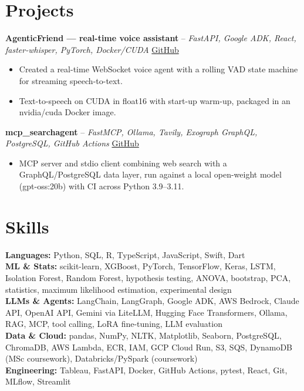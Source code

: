 \documentclass[a4paper,10pt]{article}
\begin{document}
\section{Projects}
\noindent\textbf{AgenticFriend — real-time voice assistant} -- \textit{FastAPI, Google ADK, React, faster-whisper, PyTorch, Docker/CUDA} \hfill \href{https://github.com/Thiruvel-AP/adk_multi-agent}{GitHub}
\begin{itemize}
  \item Created a real-time WebSocket voice agent with a rolling VAD state machine for streaming speech-to-text.
  \item Text-to-speech on CUDA in float16 with start-up warm-up, packaged in an nvidia/cuda Docker image.
\end{itemize}
\noindent\textbf{mcp\_searchagent} -- \textit{FastMCP, Ollama, Tavily, Exograph GraphQL, PostgreSQL, GitHub Actions} \hfill \href{https://github.com/Thiruvel-AP/mcp_searchagent}{GitHub}
\begin{itemize}
  \item MCP server and stdio client combining web search with a GraphQL/PostgreSQL data layer, run against a local open-weight model (gpt-oss:20b) with CI across Python 3.9–3.11.
\end{itemize}

\section{Skills}
\textbf{Languages:} Python, SQL, R, TypeScript, JavaScript, Swift, Dart\\
\textbf{ML \& Stats:} scikit-learn, XGBoost, PyTorch, TensorFlow, Keras, LSTM, Isolation Forest, Random Forest, hypothesis testing, ANOVA, bootstrap, PCA, statistics, maximum likelihood estimation, experimental design\\
\textbf{LLMs \& Agents:} LangChain, LangGraph, Google ADK, AWS Bedrock, Claude API, OpenAI API, Gemini via LiteLLM, Hugging Face Transformers, Ollama, RAG, MCP, tool calling, LoRA fine-tuning, LLM evaluation\\
\textbf{Data \& Cloud:} pandas, NumPy, NLTK, Matplotlib, Seaborn, PostgreSQL, ChromaDB, AWS Lambda, ECR, IAM, GCP Cloud Run, S3, SQS, DynamoDB (MSc coursework), Databricks/PySpark (coursework)\\
\textbf{Engineering:} Tableau, FastAPI, Docker, GitHub Actions, pytest, React, Git, MLflow, Streamlit

\end{document}
